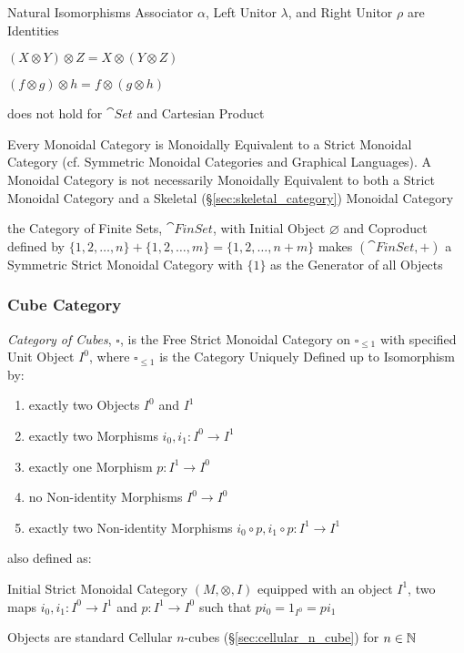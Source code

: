 Natural Isomorphisms Associator $\alpha$, Left Unitor $\lambda$, and
Right Unitor $\rho$ are Identities

$(X \otimes Y) \otimes Z = X \otimes (Y \otimes Z)$

$(f \otimes g) \otimes h = f \otimes (g \otimes h)$

does not hold for $\cat{Set}$ and Cartesian Product

Every Monoidal Category is Monoidally Equivalent to a Strict Monoidal
Category (cf. Symmetric Monoidal Categories and Graphical Languages).
A Monoidal Category is not necessarily Monoidally Equivalent to both a
Strict Monoidal Category and a Skeletal
(\S\ref{sec:skeletal_category}) Monoidal Category

the Category of Finite Sets, $\cat{FinSet}$, with Initial Object $\varnothing$
and Coproduct defined by $\{1,2,\ldots,n\} + \{1,2,\ldots,m\} =
\{1,2,\ldots,n+m\}$ makes $(\cat{FinSet}, +)$ a
Symmetric Strict Monoidal Category with $\{1\}$ as the Generator of all Objects



\subsubsection{Cube Category}\label{sec:cube_category}

\emph{Category of Cubes}, $\square$, is the Free Strict Monoidal
Category on $\square_{\leq 1}$ with specified Unit Object $I^0$, where
$\square_{\leq 1}$ is the Category Uniquely Defined up to Isomorphism
by:
\begin{enumerate}
  \item exactly two Objects $I^0$ and $I^1$
  \item exactly two Morphisms $i_0, i_1 : I^0 \rightarrow I^1$
  \item exactly one Morphism $p : I^1 \rightarrow I^0$
  \item no Non-identity Morphisms $I^0 \rightarrow I^0$
  \item exactly two Non-identity Morphisms
    $i_0 \circ p, i_1 \circ p : I^1 \rightarrow I^1$
\end{enumerate}

also defined as:

Initial Strict Monoidal Category $(M, \otimes, I)$ equipped with an
object $I^1$, two maps $i_0, i_1 : I^0 \rightarrow I^1$ and $p : I^1
\rightarrow I^0$ such that $pi_0 = 1_{I^0} = pi_1$

Objects are standard Cellular $n$-cubes (\S\ref{sec:cellular_n_cube})
for $n \in \mathbb{N}$

